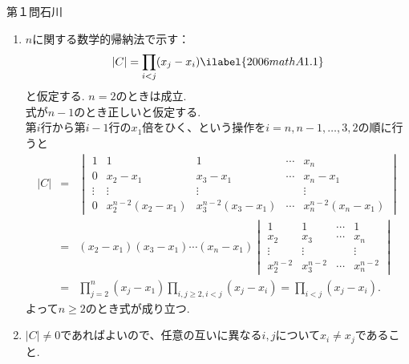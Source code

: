 \begin{answer}{第１問}{石川}
\begin{enumerate}
\item
  $n$に関する数学的帰納法で示す：\\
  \begin{equation}
    |C|= \prod _{i<j}(x_j-x_i) \ilabel{2006mathA1.1}
  \end{equation}
  と仮定する. $n=2$のときは成立.\\
  式が$n-1$のとき正しいと仮定する.\\
  第$i$行から第$i-1$行の$x_1$倍をひく、という操作を$i=n,n-1,\ldots,3,2$の順に行うと\\
  \begin{eqnarray}
    |C|
      &=& \begin{vmatrix}
         1 & 1 & 1 & \cdots  & x_n\\
         0 & x_2-x_1 & x_3-x_1 & \cdots  & x_n-x_1 \\
         \vdots & \vdots & \vdots & & \vdots\\
         0 & x_2^{n-2}(x_2-x_1) & x_3^{n-2}(x_3-x_1) & \cdots  & x_n^{n-2}(x_n-x_1) 
        \end{vmatrix}\\
      &=&(x_2-x_1)(x_3-x_1)\cdots (x_n-x_1)
        \begin{vmatrix}
          1 & 1 & \cdots  & 1\\
          x_2 & x_3 & \cdots  & x_n \\
          \vdots & \vdots & & \vdots\\
          x_2^{n-2} & x_3^{n-2} & \cdots  & x_n^{n-2} 
        \end{vmatrix}\\
      &=&\prod_{j=2}^n (x_j-x_1) \prod_{i,j\geq 2 , i<j}(x_j-x_i) = \prod_{i<j}(x_j-x_i).
  \end{eqnarray}
  よって$n\geq 2$のとき式が成り立つ.
\item
  $|C|\neq 0$であればよいので、任意の互いに異なる$i,j$について$x_i\neq x_j$であること.
\end{enumerate}
\end{answer}

